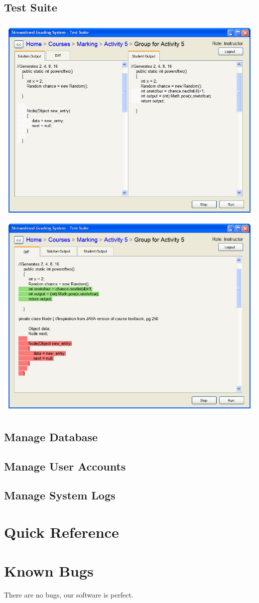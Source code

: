 \documentclass{article}
\begin{document}
\subsection{Test Suite}
\begin{center}
\includegraphics[scale=0.6]{../images/UIMockups/PNG_Renders/SRS_TestSuite_Split}
\includegraphics[scale=0.6]{../images/UIMockups/PNG_Renders/SRS_TestSuite_Tabs}
\end{center}

\subsection{Manage Database}

\subsection{Manage User Accounts}

\subsection{Manage System Logs}

\section{Quick Reference}  %

\section{Known Bugs}
There are no bugs, our software is perfect.
\end{document}

